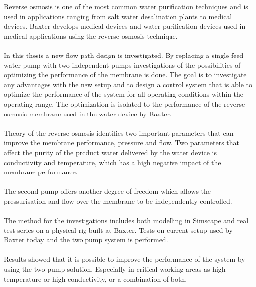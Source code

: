 
Reverse osmosis is one of the most common water purification techniques and is used in applications ranging from salt water desalination plants to medical devices. Baxter develops medical devices and water purification devices used in medical applications using the reverse osmosis technique. \\
\\
In this thesis a new flow path design is investigated. By replacing a single feed water pump with two independent pumps investigations of the possibilities of optimizing the performance of the membrane is done. The goal is to investigate any advantages with the new setup and to design a control system that is able to optimize the performance of the system for all operating conditions within the operating range. The optimization is isolated to the performance of the reverse osmosis membrane used in the water device by Baxter.\\
\\
Theory of the reverse osmosis identifies two important parameters that can improve the membrane performance, pressure and flow. Two parameters that affect the purity of the product water delivered by the water device is conductivity and temperature, which has a high negative impact of the membrane performance.\\
\\
The second pump offers another degree of freedom which allows the pressurisation and flow over the membrane to be independently controlled. \\
\\
The method for the investigations includes both modelling in Simscape and real test series on a physical rig built at Baxter. Tests on current setup used by Baxter today and the two pump system is performed. \\
\\
Results showed that it is possible to improve the performance of the system by using the two pump solution. Especially in critical working areas as high temperature or high conductivity, or a combination of both.\\ 
\\
 